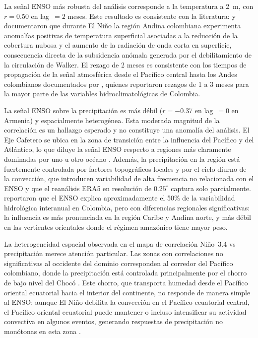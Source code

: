 \documentclass[12pt, a4paper]{article}
\begin{document}
La señal ENSO más robusta del análisis corresponde a la temperatura a 2~m,
con $r = 0.50$ en lag~$= 2$ meses. Este resultado es consistente con la
literatura: \citet{Poveda1997} y \citet{Poveda2001} documentaron que durante
El Niño la región Andina colombiana experimenta anomalías positivas de
temperatura superficial asociadas a la reducción de la cobertura nubosa y el
aumento de la radiación de onda corta en superficie, consecuencia directa de
la subsidencia anómala generada por el debilitamiento de la circulación de
Walker. El rezago de 2 meses es consistente con los tiempos de propagación
de la señal atmosférica desde el Pacífico central hasta los Andes colombianos
documentados por \citet{CórdobaMachado2015a}, quienes reportaron rezagos de
1 a 3 meses para la mayor parte de las variables hidroclimatológicas de
Colombia.

La señal ENSO sobre la precipitación es más débil ($r = -0.37$ en lag~$= 0$
en Armenia) y espacialmente heterogénea. Esta moderada magnitud de la
correlación es un hallazgo esperado y no constituye una anomalía del análisis.
El Eje Cafetero se ubica en la zona de transición entre la influencia del
Pacífico y del Atlántico, lo que diluye la señal ENSO respecto a regiones
más claramente dominadas por uno u otro océano \citep{Hoyos2018}. Además,
la precipitación en la región está fuertemente controlada por factores
topográficos locales y por el ciclo diurno de la convección, que introducen
variabilidad de alta frecuencia no relacionada con el ENSO y que el reanálisis
ERA5 en resolución de $0.25^\circ$ captura solo parcialmente. \citet{Poveda2011}
reportaron que el ENSO explica aproximadamente el 50\% de la variabilidad
hidrológica interanual en Colombia, pero con diferencias regionales
significativas: la influencia es más pronunciada en la región Caribe y
Andina norte, y más débil en las vertientes orientales donde el régimen
amazónico tiene mayor peso.

La heterogeneidad espacial observada en el mapa de correlación Niño~3.4 vs
precipitación merece atención particular. Las zonas con correlaciones no
significativas al occidente del dominio corresponden al corredor del Pacífico
colombiano, donde la precipitación está controlada principalmente por el chorro
de bajo nivel del Chocó \citep{Hoyos2018}. Este chorro, que transporta humedad
desde el Pacífico oriental ecuatorial hacia el interior del continente, no
responde de manera simple al ENSO: aunque El Niño debilita la convección en el
Pacífico ecuatorial central, el Pacífico oriental ecuatorial puede mantener o
incluso intensificar su actividad convectiva en algunos eventos, generando
respuestas de precipitación no monótonas en esta zona \citep{CórdobaMachado2015a}.
\end{document}
